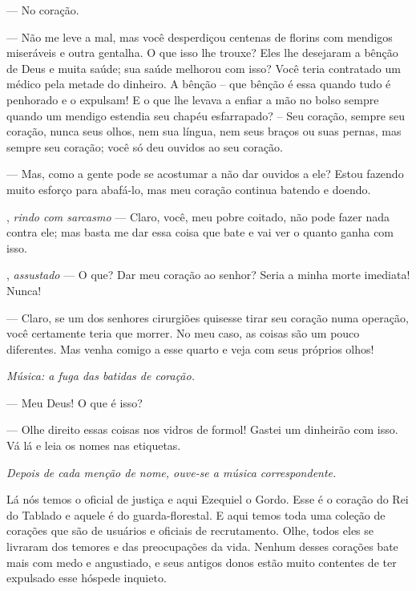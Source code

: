 \begin{myparindent}{0pt}
\begin{Parskip}
 --- No coração.

 --- Não me leve a mal, mas você desperdiçou centenas de
florins com mendigos miseráveis e outra gentalha. O que isso lhe trouxe?
Eles lhe desejaram a bênção de Deus e muita saúde; sua saúde melhorou
com isso? Você teria contratado um médico pela metade do dinheiro. A
bênção -- que bênção é essa quando tudo é penhorado e o expulsam! E o
que lhe levava a enfiar a mão no bolso sempre quando um mendigo estendia
seu chapéu esfarrapado? -- Seu coração, sempre seu coração, nunca seus
olhos, nem sua língua, nem seus braços ou suas pernas, mas sempre seu
coração; você só deu ouvidos ao seu coração.

 --- Mas, como a gente pode se acostumar a não dar
ouvidos a ele? Estou fazendo muito esforço para abafá-lo, mas meu
coração continua batendo e doendo.

, \emph{rindo com sarcasmo} --- Claro, você, meu pobre
coitado, não pode fazer nada contra ele; mas basta me dar essa coisa que
bate e vai ver o quanto ganha com isso.

, \emph{assustado} --- O que? Dar meu coração ao
senhor? Seria a minha morte imediata! Nunca!

 --- Claro, se um dos senhores cirurgiões quisesse tirar
seu coração numa operação, você certamente teria que morrer. No meu
caso, as coisas são um pouco diferentes. Mas venha comigo a esse quarto
e veja com seus próprios olhos!

\emph{Música: a fuga das batidas de coração.}

 --- Meu Deus! O que é isso?

 --- Olhe direito essas coisas nos vidros de formol!
Gastei um dinheirão com isso. Vá lá e leia os nomes nas etiquetas.

\emph{Depois de cada menção de nome, ouve-se a música correspondente.}

Lá nós temos o oficial de justiça e aqui Ezequiel o Gordo. Esse é o
coração do Rei do Tablado e aquele é do guarda-florestal. E aqui temos
toda uma coleção de corações que são de usuários e oficiais de
recrutamento. Olhe, todos eles se livraram dos temores e das
preocupações da vida. Nenhum desses corações bate mais com medo e
angustiado, e seus antigos donos estão muito contentes de ter expulsado
esse hóspede inquieto.


\end{Parskip}
\end{myparindent}
